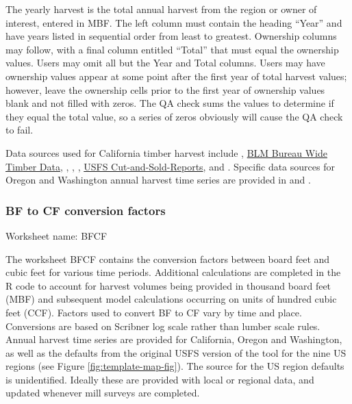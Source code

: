\documentclass[
  openany]{book}
\begin{document}
The yearly harvest is the total annual harvest from the region or owner of interest, entered in MBF. The left column must contain the heading ``Year'' and have years listed in sequential order from least to greatest. Ownership columns may follow, with a final column entitled ``Total'' that must equal the ownership values. Users may omit all but the Year and Total columns. Users may have ownership values appear at some point after the first year of total harvest values; however, leave the ownership cells prior to the first year of ownership values blank and not filled with zeros. The QA check sums the values to determine if they equal the total value, so a series of zeros obviously will cause the QA check to fail.

Data sources used for California timber harvest include \textcite{bolsinger1976}, \href{https://www.blm.gov/programs/natural-resources/forests-and-woodlands/timber-sales/bureau-wide-timber-data}{BLM Bureau Wide Timber Data}, \textcite{morgan2004}, \textcite{morgan2012}, \textcite{mciver2015}, \href{https://www.fs.fed.us/forestmanagement/products/cut-sold/index.shtml}{USFS Cut-and-Sold-Reports}, and \textcite{warren2005}. Specific data sources for Oregon and Washington annual harvest time series are provided in \textcite{morgan2021} and \textcite{nichols2020}.

\hypertarget{own-prov-input-bfcf}{%
\subsubsection{BF to CF conversion factors}\label{own-prov-input-bfcf}}

Worksheet name: BFCF

The worksheet BFCF contains the conversion factors between board feet and cubic feet for various time periods. Additional calculations are completed in the R code to account for harvest volumes being provided in thousand board feet (MBF) and subsequent model calculations occurring on units of hundred cubic feet (CCF). Factors used to convert BF to CF vary by time and place. Conversions are based on Scribner log scale rather than lumber scale rules. Annual harvest time series are provided for California, Oregon and Washington, as well as the defaults from the original USFS version of the tool for the nine US regions (see Figure \ref{fig:template-map-fig}). The source for the US region defaults is unidentified. Ideally these are provided with local or regional data, and updated whenever mill surveys are completed.
\end{document}
